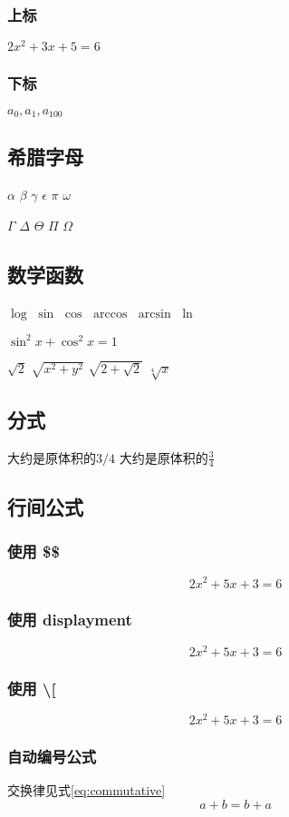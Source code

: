 \documentclass{article} %
\begin{document}
			\subsubsection{上标}
				$2x^2+3x+5=6$
			\subsubsection{下标}
				$a_0,a_1,a_{100}$
		\subsection{希腊字母}
			$\alpha$
			$\beta$
			$\gamma$
			$\epsilon$
			$\pi$
			$\omega$
	
			$\Gamma$
			$\Delta$
			$\Theta$
			$\Pi$
			$\Omega$
		\subsection{数学函数}
			$\log$
			$\sin$
			$\cos$
			$\arccos$
			$\arcsin$
			$\ln$
	
			$\sin^2x+\cos^2x=1$
	
			$\sqrt{2}$
			$\sqrt{x^2+y^2}$
			$\sqrt{2+\sqrt{2}}$
			$\sqrt[4]{x}$
	\subsection{分式}
		大约是原体积的$3/4$
		大约是原体积的$\frac{3}{4}$
	\subsection{行间公式}
		\subsubsection{使用 \$\$}
	        $$2x^2+5x+3=6$$	
		\subsubsection{使用 displayment}
			\begin{displaymath}
				2x^2+5x+3=6	
			\end{displaymath}
		\subsubsection{使用 \textbackslash[ }
			\[2x^2+5x+3=6\]
		\subsubsection{自动编号公式}
			交换律见式\ref{eq:commutative}
			\begin{equation}
				a+b=b+a \label{eq:commutative}
			\end{equation}
\end{document}
